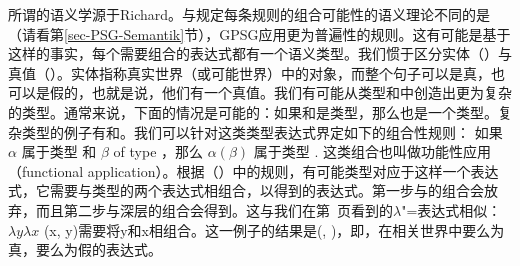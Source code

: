 所谓的语义学源于Richard\citet{Montague74a-u}。与规定每条规则的组合可能性的语义理论不同的是（请看第\ref{sec-PSG-Semantik}节），GPSG应用更为普遍性的规则。这有可能是基于这样的事实，每个需要组合的表达式都有一个语义类型。我们惯于区分实体（）与真值（）。实体指称真实世界（或可能世界）中的对象，而整个句子可以是真，也可以是假的，也就是说，他们有一个真值。我们有可能从类型和中创造出更为复杂的类型。通常来说，下面的情况是可能的：如果和是类型，那么也是一个类型。复杂类型的例子有和。我们可以针对这类类型表达式界定如下的组合性规则：
\ea
如果 $\alpha$ 属于类型  和 $\beta$ of type ，那么 $\alpha(\beta)$ 属于类型 .
\z
\addlines[2]
这类组合也叫做功能性应用（functional application）。根据（）中的规则，有可能类型对应于这样一个表达式，它需要与类型的两个表达式相组合，以得到的表达式。第一步与的组合会放弃，而且第二步与深层的组合会得到。这与我们在第~\pageref{lambda-moegen}页看到的$\lambda$"=表达式相似：$\lambda y \lambda x$ (x, y)需要将y和x相组合。这一例子的结果是(, )，即，在相关世界中要么为真，要么为假的表达式。
